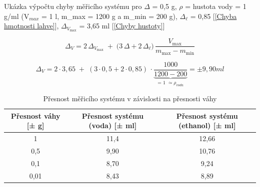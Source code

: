 \begin{center}  
\end{center}  


\bigskip
Ukázka výpočtu chyby měřicího systému pro $\Delta$ = 0,5 g, $\rho$ = hustota vody = 1 g/ml (V$_{max}$ = 1 l, m\_max = 1200 g a m\_min = 200 g), $\Delta_\ell$ = 0,85 [\ref{Chyba hmotnosti lahve}], $\Delta_{V_{\text{max}}}$ = 3,65 ml [\ref{Chyby hustoty}]

\[
\Delta_V = 2\,\Delta_{V_{\text{max}}}
      \;+\;
      \bigl(3\,\Delta+2\,\Delta_{\ell}\bigr)\,
      \frac{V_{\max}}{m_{\max}-m_{\min}}
\]

\[
\Delta_V = 2 \cdot 3,65
      \;+\;
      (3\cdot0,5+2\cdot0,85)\,
      \cdot\underbrace{\frac{1000}{1200-200}}_{\text{= 1 $\simeq \rho_{voda}$}}=\pm 9,90 ml
\]

\begin{table}
    \centering
    \begin{tabular}{|c|c|c|}
        \hline
        Přesnost váhy [± g] & Přesnost systému (voda) [± ml] & Přesnost systému (ethanol) [± ml]\\ \hline \hline
         1 & 11,4 & 12,66\\ \hline
         0,5 & 9,90 & 10,76\\ \hline
         0,1 & 8,70 & 9,24\\ \hline
         0,01 & 8,43 & 8,89\\ \hline
    \end{tabular}
    \caption{Přesnost měřicího systému v závislosti na přesnosti váhy}
    \label{tab:my_label}
\end{table}

